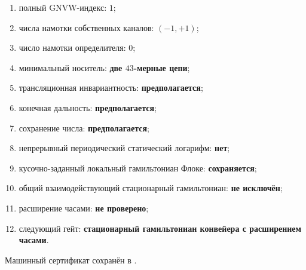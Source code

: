\begin{protocol}
\begin{enumerate}
 \item полный GNVW-индекс: \textbf{$1$};
 \item числа намотки собственных каналов: \textbf{$(-1,+1)$};
 \item число намотки определителя: \textbf{$0$};
 \item минимальный носитель: \textbf{две $43$-мерные цепи};
 \item трансляционная инвариантность: \textbf{предполагается};
 \item конечная дальность: \textbf{предполагается};
 \item сохранение числа: \textbf{предполагается};
 \item непрерывный периодический статический логарифм: \textbf{нет};
 \item кусочно-заданный локальный гамильтониан Флоке: \textbf{сохраняется};
 \item общий взаимодействующий стационарный гамильтониан: \textbf{не исключён};
 \item расширение часами: \textbf{не проверено};
 \item следующий гейт: \textbf{стационарный гамильтониан конвейера с расширением часами}.
\end{enumerate}
\end{protocol}

Машинный сертификат сохранён в
.